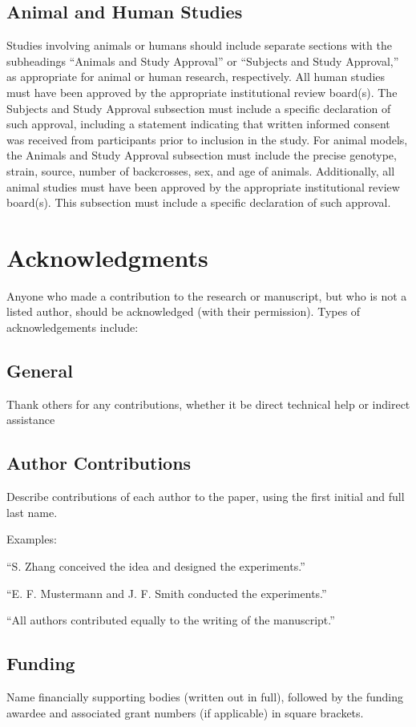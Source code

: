 \documentclass{article}
\begin{document}
\subsection{Animal and Human Studies}
Studies involving animals or humans should include separate sections with the subheadings “Animals and Study Approval” or “Subjects and Study Approval,” as appropriate for animal or human research, respectively. All human studies must have been approved by the appropriate institutional review board(s). The Subjects and Study Approval subsection must include a specific declaration of such approval, including a statement indicating that written informed consent was received from participants prior to inclusion in the study. For animal models, the Animals and Study Approval subsection must include the precise genotype, strain, source, number of backcrosses, sex, and age of animals. Additionally, all animal studies must have been approved by the appropriate institutional review board(s). This subsection must include a specific declaration of such approval.

\section*{Acknowledgments}
Anyone who made a contribution to the research or manuscript, but who is not a listed author, should be acknowledged (with their permission). Types of acknowledgements include:

\subsection*{General} 
Thank others for any contributions, whether it be direct technical help or indirect assistance 

\subsection*{Author Contributions} 
Describe contributions of each author to the paper, using the first initial and full last name. 

\medskip Examples:

``S. Zhang conceived the idea and designed the experiments.''

``E. F. Mustermann and J. F. Smith conducted the experiments.''

``All authors contributed equally to the writing of the manuscript.''

\subsection*{Funding}
Name financially supporting bodies (written out in full), followed by the funding awardee and associated grant numbers (if applicable) in square brackets. 
\end{document}

